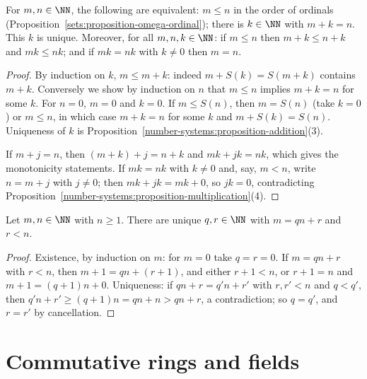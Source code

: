 \begin{proposition}\label{number-systems:proposition-order-naturals}
For $m, n \in \NN$, the following are equivalent: $m \leq n$ in the order of
ordinals (Proposition~\ref{sets:proposition-omega-ordinal}); there is
$k \in \NN$ with $m + k = n$. This $k$ is unique. Moreover, for all
$m, n, k \in \NN$: if $m \leq n$ then $m + k \leq n + k$ and $mk \leq nk$; and if
$mk = nk$ with $k \neq 0$ then $m = n$.
\end{proposition}

\begin{proof}
By induction on $k$, $m \leq m + k$: indeed $m + S(k) = S(m + k)$ contains
$m + k$. Conversely we show by induction on $n$ that $m \leq n$ implies
$m + k = n$ for some $k$. For $n = 0$, $m = 0$ and $k = 0$. If $m \leq S(n)$,
then $m = S(n)$ (take $k = 0$) or $m \leq n$, in which case $m + k = n$ for
some $k$ and $m + S(k) = S(n)$. Uniqueness of $k$ is
Proposition~\ref{number-systems:proposition-addition}(3).

If $m + j = n$, then $(m + k) + j = n + k$ and $mk + jk = nk$, which gives the
monotonicity statements. If $mk = nk$ with $k \neq 0$ and, say, $m < n$, write
$n = m + j$ with $j \neq 0$; then $mk + jk = mk + 0$, so $jk = 0$, contradicting
Proposition~\ref{number-systems:proposition-multiplication}(4).
\end{proof}

\begin{proposition}\label{number-systems:proposition-division-naturals}
Let $m, n \in \NN$ with $n \geq 1$. There are unique $q, r \in \NN$ with
$m = qn + r$ and $r < n$.
\end{proposition}

\begin{proof}
Existence, by induction on $m$: for $m = 0$ take $q = r = 0$. If $m = qn + r$ with
$r < n$, then $m + 1 = qn + (r + 1)$, and either $r + 1 < n$, or $r + 1 = n$ and
$m + 1 = (q + 1)n + 0$. Uniqueness: if $qn + r = q'n + r'$ with $r, r' < n$ and
$q < q'$, then $q'n + r' \geq (q + 1)n = qn + n > qn + r$, a contradiction; so
$q = q'$, and $r = r'$ by cancellation.
\end{proof}

\section{Commutative rings and fields}\label{number-systems:section-rings-fields}

